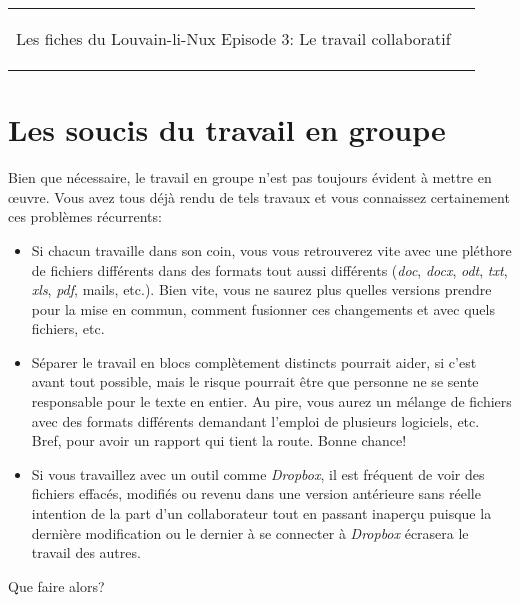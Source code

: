 



\begin{tabular}{p{13cm}r}
	\begin{center}{\Large Les fiches du Louvain-li-Nux\linebreak \linebreak
	\LARGE Episode 3: Le travail collaboratif}\end{center}
		&
	\usebox{\logollnux}
\end{tabular}
\vspace{-.5cm}

\section*{Les soucis du travail en groupe}
Bien que nécessaire,
le travail en groupe n'est pas toujours évident à mettre en \oe uvre. 
Vous avez tous déjà rendu de tels travaux et vous connaissez certainement ces problèmes récurrents:
\begin{itemize}
	\item Si chacun travaille dans son coin, vous vous retrouverez vite avec une pléthore de fichiers différents dans des formats tout aussi différents (\textit{doc}, \textit{docx}, \textit{odt}, \textit{txt}, \textit{xls}, \textit{pdf}, mails, etc.). Bien vite, vous ne saurez plus quelles versions prendre pour la mise en commun, comment fusionner ces changements et avec quels fichiers, etc.
	\item Séparer le travail en blocs complètement distincts pourrait aider, si c'est avant tout possible, mais le risque pourrait être que personne ne se sente responsable pour le texte en entier. Au pire, vous aurez un mélange de fichiers avec des formats différents demandant l'emploi de plusieurs logiciels, etc. Bref, pour avoir un rapport qui tient la route. Bonne chance!
	\item Si vous travaillez avec un outil comme \textit{Dropbox}, il est fréquent de voir des fichiers effacés, modifiés ou revenu dans une version antérieure sans réelle intention de la part d'un collaborateur tout en passant inaperçu puisque la dernière modification ou le dernier à se connecter à \textit{Dropbox} écrasera le travail des autres.
\end{itemize}
Que faire alors?

